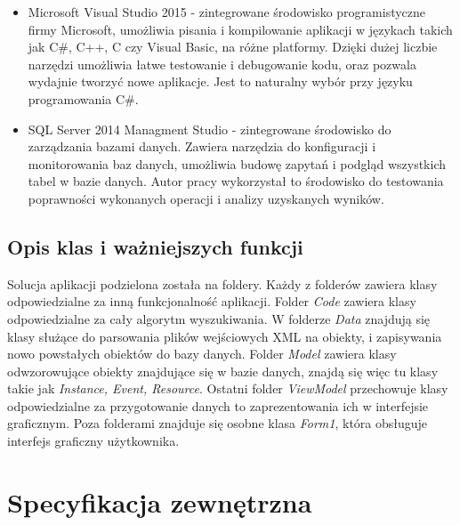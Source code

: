 \begin{itemize}
	\item Microsoft Visual Studio 2015 - zintegrowane środowisko programistyczne firmy Microsoft, umożliwia pisania i kompilowanie aplikacji w językach takich jak C\#, C++, C czy Visual Basic, na różne platformy. Dzięki dużej liczbie narzędzi umożliwia łatwe testowanie i debugowanie kodu, oraz pozwala wydajnie tworzyć nowe aplikacje. Jest to naturalny wybór przy języku programowania C\#.
	
	\item SQL Server 2014 Managment Studio - zintegrowane środowisko do zarządzania bazami danych. Zawiera narzędzia do konfiguracji i monitorowania baz danych, umożliwia budowę zapytań i podgląd wszystkich tabel w bazie danych. Autor pracy wykorzystał to środowisko do testowania poprawności wykonanych operacji i analizy uzyskanych wyników.
\end{itemize}

\subsection{Opis klas i ważniejszych funkcji}

Solucja aplikacji podzielona została na foldery. Każdy z folderów zawiera klasy odpowiedzialne za inną funkcjonalność aplikacji. Folder \textit{Code} zawiera klasy odpowiedzialne za cały algorytm wyszukiwania.  W folderze \textit{Data} znajdują się klasy służące do parsowania plików wejściowych XML na obiekty, i zapisywania nowo powstałych obiektów do bazy danych. Folder \textit{Model} zawiera klasy odwzorowujące obiekty znajdujące się w bazie danych, znajdą się więc tu klasy takie jak \textit{Instance, Event, Resource}. Ostatni folder \textit{ViewModel} przechowuje klasy odpowiedzialne za przygotowanie danych to zaprezentowania ich w interfejsie graficznym. Poza folderami znajduje się osobne klasa \textit{Form1}, która obsługuje interfejs graficzny użytkownika.


\section{Specyfikacja zewnętrzna}